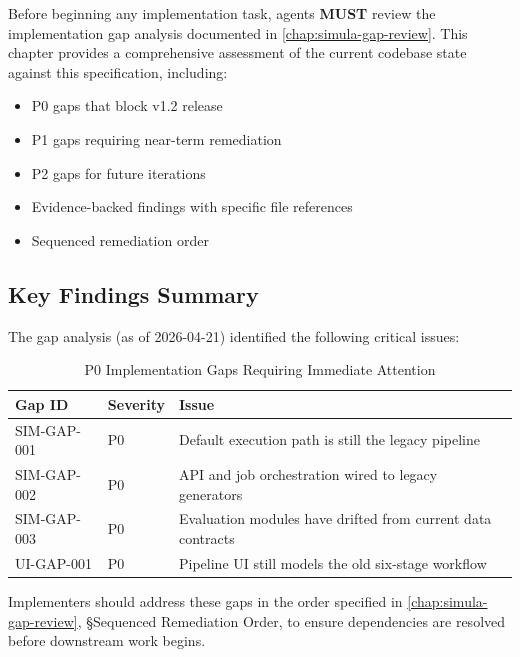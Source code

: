 \begin{tcolorbox}[colback=red!5,colframe=red!70,title=\textbf{Critical: Review Gap Analysis Before Implementation}]
Before beginning any implementation task, agents \textbf{MUST} review the implementation
gap analysis documented in \cref{chap:simula-gap-review}. This chapter provides a comprehensive
assessment of the current codebase state against this specification, including:
\begin{itemize}
  \item P0 gaps that block v1.2 release
  \item P1 gaps requiring near-term remediation
  \item P2 gaps for future iterations
  \item Evidence-backed findings with specific file references
  \item Sequenced remediation order
\end{itemize}
\end{tcolorbox}

\subsection{Key Findings Summary}

The gap analysis (as of 2026-04-21) identified the following critical issues:

\begin{table}[htbp]
\centering
\footnotesize
\caption{P0 Implementation Gaps Requiring Immediate Attention}
\label{tab:p0-gaps-summary}
\begin{tabularx}{\textwidth}{@{}l l X@{}}
\toprule
\textbf{Gap ID} & \textbf{Severity} & \textbf{Issue} \\
\midrule
SIM-GAP-001 & P0 & Default execution path is still the legacy pipeline \\
SIM-GAP-002 & P0 & API and job orchestration wired to legacy generators \\
SIM-GAP-003 & P0 & Evaluation modules have drifted from current data contracts \\
UI-GAP-001 & P0 & Pipeline UI still models the old six-stage workflow \\
\bottomrule
\end{tabularx}
\end{table}

\noindent
Implementers should address these gaps in the order specified in
\cref{chap:simula-gap-review}, \S{}Sequenced Remediation Order, to ensure
dependencies are resolved before downstream work begins.


